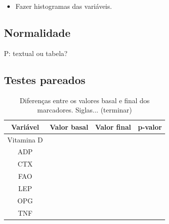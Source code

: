 \documentclass[a4paper]{article}
\begin{document}
\begin{itemize}
\item Fazer histogramas das variáveis.
\end{itemize}


\subsection{Normalidade}

P: textual ou tabela?

\subsection{Testes pareados}

\begin{table}[!h]
  \centering
  \begin{tabular}{c|cc|c}
    \hline
    Variável&Valor basal&Valor final&p-valor\\
    \hline
    \hline
    Vitamina D&&&\\
\hline
    ADP&&&\\
    CTX&&&\\
    FAO&&&\\
    LEP&&&\\
    OPG&&&\\
    TNF&&&\\
    \hline
  \end{tabular}
  \caption[Diferenças entre os valores basal e final dos marcadores]{Diferenças entre os valores basal e final dos marcadores. Siglas... (terminar)}
  \label{tab:testes-pareados}
\end{table}
\end{document}
